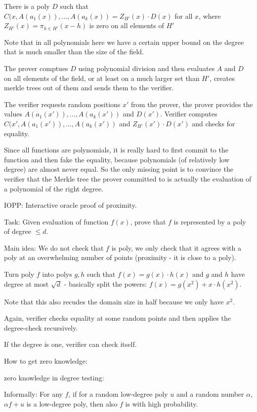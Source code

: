 \documentclass[11pt,letterpaper]{article}
\begin{document}
There is a poly $D$ such that
$C(x, A(a_1(x)), \dots, A(a_k(x)) = Z_{H'}(x) \cdot D(x)$ for all $x$, where
$Z_{H'}(x) = \pi_{h \in H'}(x-h)$ is zero on all elements of $H'$

Note that in all polynomials here we have a certain upper bound on the degree that is much
smaller than the size of the field.

The prover comptues $D$ using polynomial division and then evaluates $A$ and $D$
on all elements of the field, or
at least on a much larger set than $H'$, creates merkle trees out of them and sends
them to the verifier.

The verifier requests random positions $x'$ from the prover, the prover provides the values
$A(a_1(x')), \dots, A(a_k(x'))$ and $D(x')$. Verifier computes
$C(x', A(a_1(x')), \dots, A(a_k(x'))$ and $Z_{H'}(x') \cdot D(x')$ and checks for equality.

Since all functions are polynomials, it is really hard to first commit to the function
and then fake the equality, because polynomials (of relatively low degree) are almost
never equal. So the only missing point is to convince the verifier that the
Merkle tree the prover committed to is actually the evaluation of a polynomial of the
right degree.

IOPP: Interactive oracle proof of proximity.

Task: Given evaluation of function $f(x)$, prove that $f$ is represented by a
poly of degree $\le d$.

Main idea: We do not check that $f$ is poly, we only check that it agrees with a
poly at an overwhelming number of points (proximity - it is close to a poly).

Turn poly $f$ into polys $g,h$ such that $f(x) = g(x)\cdot h(x)$ and $g$ and $h$
have degree at most $\sqrt{d}$ - basically split the powers: $f(x) = g(x^2) + x \cdot h(x^2)$.

Note that this also recudes the domain size in half because we only have $x^2$.

Again, verifier checks equality at some random points and then applies the degree-check recursively.

If the degree is one, verifier can check itself.

How to get zero knowledge:

zero knowledge in degree testing: 

Informally: For any $f$, if for a random low-degree poly $u$ and a random number $\alpha$,
$\alpha f+u$ is a low-degree poly, then also $f$ is with high probability.
\end{document}
